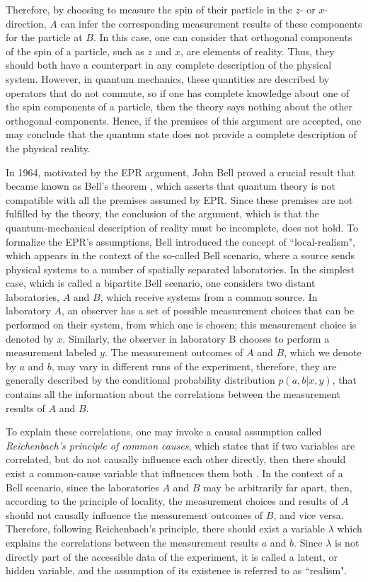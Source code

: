 \documentclass[aps,pra,reprint, superscriptaddress,showkeys]{revtex4-2}
\theoremstyle{plain}
\begin{document}
Therefore, by choosing to measure the spin of their particle in the \( z \)- or \( x \)-direction, $A$ can infer the corresponding measurement results of these components for the particle at $B$. In this case, one can consider that orthogonal components of the spin of a particle, such as \(z\) and \(x\), are elements of reality. Thus, they should both have a counterpart in any complete description of the physical system. However, in quantum mechanics, these quantities are described by operators that do not commute, so if one has complete knowledge about one of the spin components of a particle, then the theory says nothing about the other orthogonal components. Hence, if the premises of this argument are accepted, one may conclude that the quantum state does not provide a complete description of the physical reality.

In 1964, motivated by the EPR argument, John Bell proved a crucial result that became known as Bell's theorem \cite{bell1964einstein}, which asserts that quantum theory is not compatible with all the premises assumed by EPR. Since these premises are not fulfilled by the theory, the conclusion of the argument, which is that the quantum-mechanical description of reality must be incomplete, does not hold. To formalize the EPR's assumptions, Bell introduced the concept of ``local-realism", which appears in the context of the so-called Bell scenario, where a source sends physical systems to a number of spatially separated laboratories. In the simplest case, which is called a bipartite Bell scenario, one considers two distant laboratories, $A$ and $B$, which receive systems from a common source. In laboratory $A$, an observer has a set of possible measurement choices that can be performed on their system, from which one is chosen; this measurement choice is denoted by $x$. Similarly, the observer in laboratory B chooses to perform a measurement labeled $y$. The measurement outcomes of $A$ and $B$, which we denote by $a$ and $b$, may vary in different runs of the experiment, therefore, they are generally described by the conditional probability distribution $p(a,b|x,y)$, that contains all the information about the correlations between the measurement results of $A$ and $B$.

To explain these correlations, one may invoke a causal assumption called \textit{Reichenbach's principle of common causes}, which states that if two variables are correlated, but do not causally influence each other directly, then there should exist a common-cause variable that influences them both \cite{reichenbach1991direction}. In the context of a Bell scenario, since the laboratories $A$ and $B$ may be arbitrarily far apart, then, according to the principle of locality, the measurement choices and results of $A$ should not causally influence the measurement outcomes of $B$, and vice versa. Therefore, following Reichenbach's principle, there should exist a variable $\lambda$ which explains the correlations between the measurement results $a$ and $b$. Since $\lambda$ is not directly part of the accessible data of the experiment, it is called a latent, or hidden variable, and the assumption of its existence is referred to as ``realism".
\end{document}
